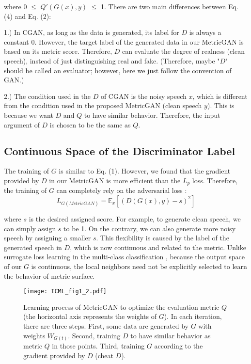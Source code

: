 \documentclass{article}
\begin{document}
where 0 $\leq$ $Q'(G(x), y)$ $\leq$ 1. There are two main differences between Eq. (4) and Eq. (2): 

1.) In CGAN, as long as the data is generated, its label for $D$ is always a constant 0. However, the target label of the generated data in our MetricGAN is based on its metric score. Therefore, $D$ can evaluate the degree of realness (clean speech), instead of just distinguishing real and fake. (Therefore, maybe "$D$" should be called an evaluator; however, here we just follow the convention of GAN.)

2.) The condition used in the $D$ of CGAN is the noisy speech $x$, which is different from the condition used in the proposed MetricGAN (clean speech $y$). This is because we want $D$ and $Q$ to have similar behavior. Therefore, the input argument of $D$ is chosen to be the same as $Q$.

\subsection{Continuous Space of the Discriminator Label}
The training of $G$ is similar to Eq. (1). However, we found that the gradient provided by $D$ in our MetricGAN is more efficient than the $L_{p}$ loss. Therefore, the training of $G$ can completely rely on the adversarial loss :
\begin{equation}
L_{G (MetricGAN)}= \mathbb{E}_{x} [(D(G(x), y) - s)^2]
\end{equation}

where $s$ is the desired assigned score. For example, to generate clean speech, we can simply assign $s$ to be 1. On the contrary, we can also generate more noisy speech by assigning a smaller $s$. This flexibility is caused by the label of the generated speech in $D$, which is now continuous and related to the metric. Unlike surrogate loss learning in the multi-class classification \cite{hsieh2018deep}, because the output space of our $G$ is continuous, the local neighbors need not be explicitly selected to learn the behavior of metric surface.


\begin{figure}[ht]
\vskip 0.1in
\begin{center}
\centerline{\texttt{[image: ICML\_fig1\_2.pdf]}}
\vskip -0.1in
\caption{Learning process of MetricGAN to optimize the evaluation metric $Q$ (the horizontal axis represents the weights of $G$). In each iteration, there are three steps. First, some data are generated by $G$ with weights $W_{G(t)}$. Second, training $D$ to have similar behavior as metric $Q$ in those points. Third, training $G$ according to the gradient provided by $D$ (cheat $D$).}
\label{fig:MetricGAN_explain}
\end{center}
\vskip -0.2in
\end{figure}
\end{document}
